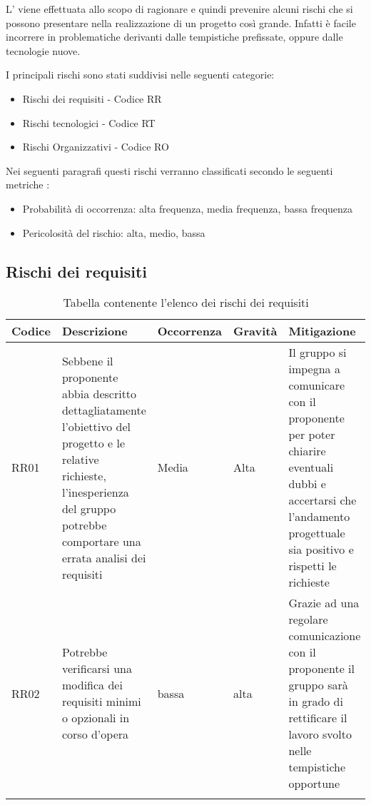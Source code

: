 \documentclass[../piano_di_progetto.tex]{subfiles}
\begin{document}
L’  viene effettuata allo scopo di ragionare e quindi prevenire alcuni rischi che si possono presentare nella realizzazione di un progetto così grande. Infatti è facile incorrere in problematiche derivanti dalle tempistiche prefissate, oppure dalle tecnologie nuove.

I principali rischi sono stati suddivisi nelle seguenti categorie:
\begin{itemize}
\item Rischi dei requisiti - Codice RR
\item Rischi tecnologici  - Codice RT
\item Rischi Organizzativi - Codice RO
\end{itemize}
Nei seguenti paragrafi questi rischi verranno classificati secondo le seguenti metriche :
\begin{itemize}
\item Probabilità di occorrenza: alta frequenza, media frequenza, bassa frequenza
\item Pericolosità del rischio: alta, medio, bassa
\end{itemize}

\subsection{Rischi dei requisiti}%
\label{sub:rischi_req}

\begin{center}
	\begin{longtable}{|p{1.6cm}|p{3.5cm}|p{2cm}|p{2cm}|p{3.5cm}|}
		\hline
		\rowcolor{lightgray}
		{\textbf{Codice}} & {\textbf{Descrizione}} & {\textbf{Occorrenza}} & {\textbf{Gravità}} & {\textbf{Mitigazione}} \\

		\hline
			RR01 &
			Sebbene il proponente abbia descritto dettagliatamente l’obiettivo del progetto e le relative richieste, l’inesperienza del gruppo potrebbe comportare una errata analisi dei requisiti
			&
			Media
			& 
			Alta
			&
			Il gruppo si impegna a comunicare con il proponente per poter chiarire eventuali dubbi e accertarsi che l’andamento progettuale sia positivo e rispetti le richieste\\
			
			\hline
			RR02 &
			Potrebbe verificarsi una modifica dei requisiti minimi o opzionali in corso d’opera
			&
			bassa
			& 
			alta
			& 
			Grazie ad una regolare comunicazione con il proponente il gruppo sarà in grado di rettificare il lavoro svolto nelle tempistiche opportune\\
			\hline
			\rowcolor{white}
\caption{Tabella contenente l'elenco dei rischi dei requisiti}
	\end{longtable}

\end{center}
\end{document}
